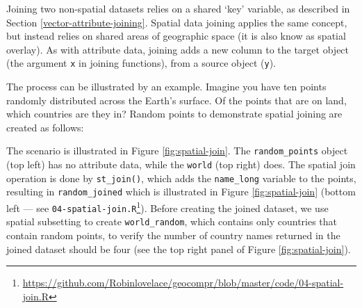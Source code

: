 \documentclass[]{krantz}
\newenvironment{Shaded}{\begin{snugshade}}{\end{snugshade}}
\newcommand{\CommentTok}[1]{\textcolor[rgb]{0.37,0.37,0.37}{\textit{#1}}}
\newcommand{\DataTypeTok}[1]{\textcolor[rgb]{0.27,0.27,0.27}{#1}}
\newcommand{\DecValTok}[1]{\textcolor[rgb]{0.06,0.06,0.06}{#1}}
\newcommand{\KeywordTok}[1]{\textcolor[rgb]{0.27,0.27,0.27}{\textbf{#1}}}
\newcommand{\NormalTok}[1]{#1}
\newcommand{\OperatorTok}[1]{\textcolor[rgb]{0.43,0.43,0.43}{\textbf{#1}}}
\newcommand{\StringTok}[1]{\textcolor[rgb]{0.5,0.5,0.5}{#1}}
\let\rmarkdownfootnote\footnote%
\def\footnote{\protect\rmarkdownfootnote}
\renewcommand{\href}[2]{#2\footnote{\url{#1}}}
\begin{document}
Joining two non-spatial datasets relies on a shared `key' variable, as described in Section \ref{vector-attribute-joining}.
Spatial data joining applies the same concept, but instead relies on shared areas of geographic space (it is also know as spatial overlay).
As with attribute data, joining adds a new column to the target object (the argument \texttt{x} in joining functions), from a source object (\texttt{y}).

The process can be illustrated by an example.
Imagine you have ten points randomly distributed across the Earth's surface.
Of the points that are on land, which countries are they in?
Random points to demonstrate spatial joining are created as follows:

\begin{Shaded}
\end{Shaded}

The scenario is illustrated in Figure \ref{fig:spatial-join}.
The \texttt{random\_points} object (top left) has no attribute data, while the \texttt{world} (top right) does.
The spatial join operation is done by \texttt{st\_join()}, which adds the \texttt{name\_long} variable to the points, resulting in \texttt{random\_joined} which is illustrated in Figure \ref{fig:spatial-join} (bottom left --- see \href{https://github.com/Robinlovelace/geocompr/blob/master/code/04-spatial-join.R}{\texttt{04-spatial-join.R}}).
Before creating the joined dataset, we use spatial subsetting to create \texttt{world\_random}, which contains only countries that contain random points, to verify the number of country names returned in the joined dataset should be four (see the top right panel of Figure \ref{fig:spatial-join}).
\end{document}
